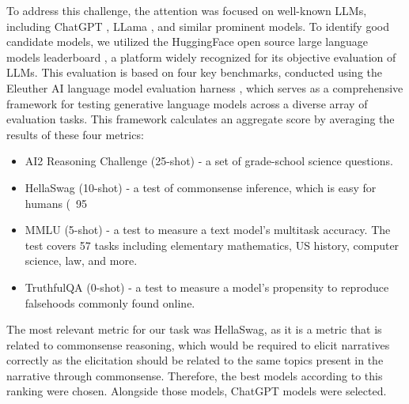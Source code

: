 To address this challenge, the attention was focused on well-known LLMs, including ChatGPT \cite{chatgpt}, LLama \cite{touvron2023llama}, and similar prominent models. To identify good candidate models, we utilized the HuggingFace open source large language models leaderboard \cite{huggingface-leaderboard}, a platform widely recognized for its objective evaluation of LLMs. This evaluation is based on four key benchmarks, conducted using the Eleuther AI language model evaluation harness \cite{eleuther}, which serves as a comprehensive framework for testing generative language models across a diverse array of evaluation tasks. This framework calculates an aggregate score by averaging the results of these four metrics:
\begin{itemize}
    \item {AI2 Reasoning Challenge (25-shot)} \cite{AI2} - a set of grade-school science questions.
    \item {HellaSwag (10-shot)} \cite{HellaSwag} - a test of commonsense inference, which is easy for humans (~95%
    \item {MMLU (5-shot)} \cite{MMLU} - a test to measure a text model's multitask accuracy. The test covers 57 tasks including elementary mathematics, US history, computer science, law, and more.
    \item {TruthfulQA (0-shot)} \cite{Truthful} - a test to measure a model’s propensity to reproduce falsehoods commonly found online.
\end{itemize}
The most relevant metric for our task was HellaSwag, as it is a metric that is related to commonsense reasoning, which would be required to elicit narratives correctly as the elicitation should be related to the same topics present in the narrative through commonsense. Therefore, the best models according to this ranking were chosen. Alongside those models, ChatGPT models were selected. 

